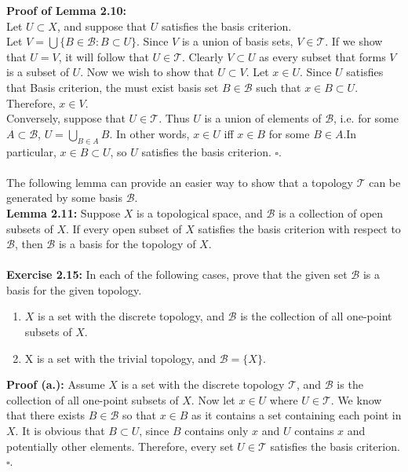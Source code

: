 \documentclass{article}
\begin{document}
\textbf{Proof of Lemma 2.10: }\\
Let $U\subset X$, and suppose that $U$ satisfies the basis criterion.\\
Let $V=\bigcup\{B\in\mathcal{B}:B\subset U\}$. Since $V$ is a union of basis sets, $V\in \mathcal{T}$. If we show that $U=V$, it will follow that $U\in \mathcal{T}$. Clearly $V\subset U$ as every subset that forms $V$ is a subset of $U$. Now we wish to show that $U\subset V$. Let $x\in U$. Since $U$ satisfies that Basis criterion, the must exist basis set $B\in\mathcal{B}$ such that $x\in B\subset U$. Therefore, $x\in V$.\\
Conversely, suppose that $U\in \mathcal {T}$. Thus $U$ is a union of elements of $\mathcal{B}$, i.e. for some $A\subset \mathcal{B}$, $U=\bigcup_{B\in A} B$. In other words, $x\in U$ iff $x\in B$ for some $B\in A$.In particular, $x\in B\subset U$, so $U$ satisfies the basis criterion. $\square$.\\
\\
The following lemma can provide an easier way to show that a topology $\mathcal{T}$ can be generated by some basis $\mathcal{B}$.\\
\textbf{Lemma 2.11:} Suppose $X$ is a topological space, and $\mathcal{B}$ is a collection of open subsets of $X$. If every open subset of $X$ satisfies the basis criterion with respect to $\mathcal{B}$, then $\mathcal{B}$ is a basis for the topology of $X$.\\
\\
\textbf{Exercise 2.15:} In each of the following cases, prove that the given set $\mathcal{B}$ is a basis for the given topology.\\
\begin{enumerate}[label=(\alph*.)]
    \item  $X$ is a set with the discrete topology, and $\mathcal{B}$ is the collection of all
    one-point subsets of $X$.
    \item X is a set with the trivial topology, and $\mathcal{B} = \{X\}$.
\end{enumerate}
\textbf{Proof (a.):} Assume $X$ is a set with the discrete topology $\mathcal{T}$, and $\mathcal{B}$ is the collection of all one-point subsets of $X$. Now let $x\in U$ where $U\in \mathcal{T}$. We know that there exists $B\in\mathcal{B}$ so that $x\in B$ as it contains a set containing each point in $X$. It is obvious that $B\subset U$, since $B$ contains only $x$ and $U$ contains $x$ and potentially other elements. Therefore, every set $U\in \mathcal{T}$ satisfies the basis criterion. $\square$.\\
\end{document}
